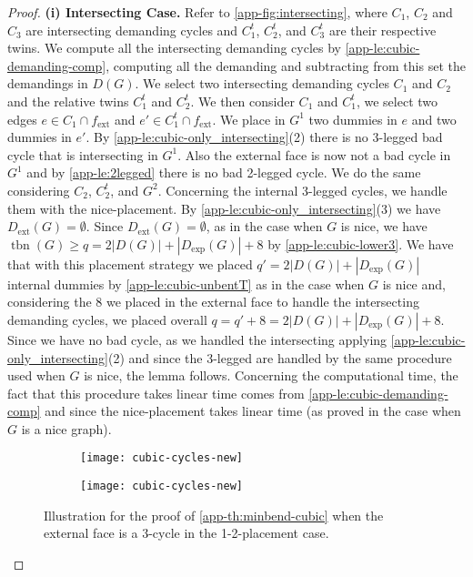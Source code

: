 \documentclass[runningheads]{llncs}
\newcommand{\tbn}{\operatorname{tbn}}
\newcommand{\ext}{\operatorname{ext}}
\begin{document}
\begin{proof}
\smallskip
\noindent
{\sffamily\bfseries (i) Intersecting Case.} Refer to \cref{app-fig:intersecting}, where $C_1$, $C_2$ and $C_3$ are intersecting demanding cycles and $C_1^t$, $C_2^t$, and $C_3^t$ are their respective twins.  We compute all the intersecting demanding cycles by \cref{app-le:cubic-demanding-comp}, computing all the demanding and subtracting from this set the demandings in $D(G)$. We select two intersecting demanding cycles $C_1$ and $C_2$ and the relative twins $C_1^t$ and $C_2^t$. We then consider $C_1$ and $C_1^t$, we select two edges $e\in C_1\cap f_{\ext}$ and $e'\in C_1^t\cap f_{\ext}$. We place in $G^1$ two dummies in $e$ and two dummies in $e'$. By \cref{app-le:cubic-only_intersecting}(2) there is no 3-legged bad cycle that is intersecting in $G^1$. Also the external face is now not a bad cycle in $G^1$ and by \cref{app-le:2legged} there is no bad 2-legged cycle. We do the same considering $C_2$, $C_2^t$, and $G^2$. Concerning the internal 3-legged cycles, we handle them with the nice-placement.
By \cref{app-le:cubic-only_intersecting}(3) we have $D_{\ext}(G)=\emptyset$.  Since $D_{\ext}(G)=\emptyset$, as in the case when $G$ is nice, we have $\tbn(G) \ge q=2|D(G)|+|D_{\exp}(G)|+8$ by \cref{app-le:cubic-lower3}.  We have that with this placement strategy we placed $q'=2|D(G)|+|D_{\exp}(G)|$ internal dummies by \cref{app-le:cubic-unbentT} as in the case when $G$ is nice and, considering the $8$ we placed in the external face to handle the intersecting demanding cycles, we placed overall $q=q'+8=2|D(G)|+|D_{\exp}(G)|+8$. Since we have no bad cycle, as we handled the intersecting applying  \cref{app-le:cubic-only_intersecting}(2) and since the 3-legged are handled by the same procedure used when $G$ is nice, the lemma follows. Concerning the computational time, the fact that this procedure takes linear time comes from \cref{app-le:cubic-demanding-comp} and since the nice-placement takes linear time (as proved in the case when $G$ is a nice graph).


\begin{figure}[t]
  \begin{subfigure}{0.45\textwidth}
    \centering
    \texttt{[image: cubic-cycles-new]}
     \label{fig:cubic-collection-3cycle-a}
  \end{subfigure}
  \hfill
  \begin{subfigure}{0.45\textwidth}
    \centering
    \texttt{[image: cubic-cycles-new]}
    \label{fig:cubic-collection-3cycle-b}
 \end{subfigure}
  \hfill
  \caption{Illustration for the proof of \cref{app-th:minbend-cubic} when the external face is a 3-cycle in the 1-2-placement case.}
  \label{fig:cubic-collection-3cycle}
\end{figure}


\end{proof}
\end{document}
